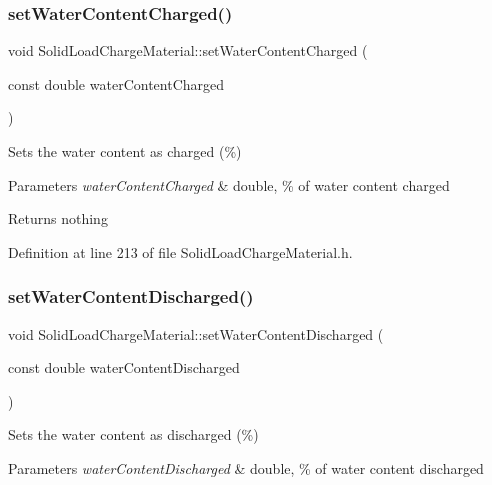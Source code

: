 \subsubsection{\texorpdfstring{set\+Water\+Content\+Charged()}{setWaterContentCharged()}\hspace{0.1cm}{\footnotesize\ttfamily [3/3]}}
{\footnotesize\ttfamily void Solid\+Load\+Charge\+Material\+::set\+Water\+Content\+Charged (\begin{DoxyParamCaption}\item[{const double}]{water\+Content\+Charged }\end{DoxyParamCaption})\hspace{0.3cm}{\ttfamily [inline]}}

Sets the water content as charged (\%) 
\begin{DoxyParams}{Parameters}
{\em water\+Content\+Charged} & double, \% of water content charged \\
\hline
\end{DoxyParams}
\begin{DoxyReturn}{Returns}
nothing 
\end{DoxyReturn}


Definition at line 213 of file Solid\+Load\+Charge\+Material.\+h.

\mbox{\label{class_solid_load_charge_material_a5104ddb43af977a751b90a0bc844d83d}} 
\subsubsection{\texorpdfstring{set\+Water\+Content\+Discharged()}{setWaterContentDischarged()}\hspace{0.1cm}{\footnotesize\ttfamily [1/3]}}
{\footnotesize\ttfamily void Solid\+Load\+Charge\+Material\+::set\+Water\+Content\+Discharged (\begin{DoxyParamCaption}\item[{const double}]{water\+Content\+Discharged }\end{DoxyParamCaption})\hspace{0.3cm}{\ttfamily [inline]}}

Sets the water content as discharged (\%) 
\begin{DoxyParams}{Parameters}
{\em water\+Content\+Discharged} & double, \% of water content discharged \\
\hline
\end{DoxyParams}


